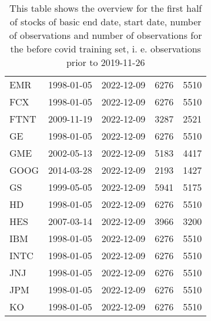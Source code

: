 \begin{table}[ht]
\begin{tabular}{lllrr}
  EMR & 1998-01-05 & 2022-12-09 & 6276 & 5510 \\ 
  FCX & 1998-01-05 & 2022-12-09 & 6276 & 5510 \\ 
  FTNT & 2009-11-19 & 2022-12-09 & 3287 & 2521 \\ 
  GE & 1998-01-05 & 2022-12-09 & 6276 & 5510 \\ 
  GME & 2002-05-13 & 2022-12-09 & 5183 & 4417 \\ 
  GOOG & 2014-03-28 & 2022-12-09 & 2193 & 1427 \\ 
  GS & 1999-05-05 & 2022-12-09 & 5941 & 5175 \\ 
  HD & 1998-01-05 & 2022-12-09 & 6276 & 5510 \\ 
  HES & 2007-03-14 & 2022-12-09 & 3966 & 3200 \\ 
  IBM & 1998-01-05 & 2022-12-09 & 6276 & 5510 \\ 
  INTC & 1998-01-05 & 2022-12-09 & 6276 & 5510 \\ 
  JNJ & 1998-01-05 & 2022-12-09 & 6276 & 5510 \\ 
  JPM & 1998-01-05 & 2022-12-09 & 6276 & 5510 \\ 
  KO & 1998-01-05 & 2022-12-09 & 6276 & 5510 \\ 
   \hline
\end{tabular}
\caption[Overview_1]{This table shows the overview for the first half of stocks of basic end date, start date, number of observations and number of observations 
                     for the before covid training set, i. e. observations prior to 2019-11-26} 
\label{Table:Overview_1}
\end{table}
